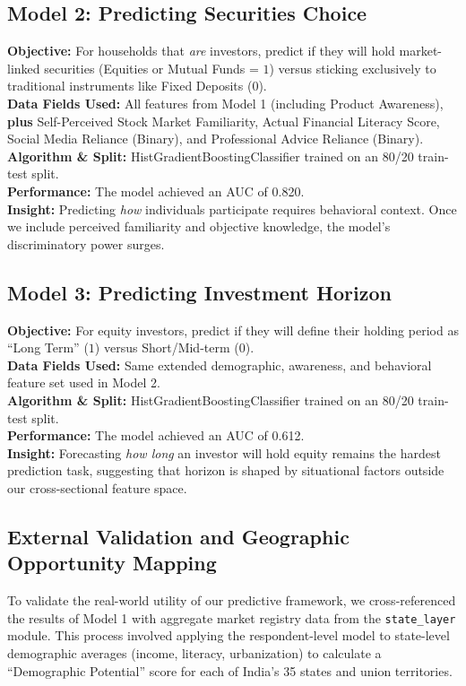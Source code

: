 \documentclass[conference]{IEEEtran}
\begin{document}
\subsection{Model 2: Predicting Securities Choice}
\textbf{Objective:} For households that \textit{are} investors, predict if they will hold market-linked securities (Equities or Mutual Funds = $1$) versus sticking exclusively to traditional instruments like Fixed Deposits ($0$). \\
\textbf{Data Fields Used:} All features from Model 1 (including Product Awareness), \textbf{plus} Self-Perceived Stock Market Familiarity, Actual Financial Literacy Score, Social Media Reliance (Binary), and Professional Advice Reliance (Binary). \\
\textbf{Algorithm \& Split:} HistGradientBoostingClassifier trained on an 80/20 train-test split. \\
\textbf{Performance:} The model achieved an AUC of 0.820. \\
\textbf{Insight:} Predicting \textit{how} individuals participate requires behavioral context. Once we include perceived familiarity and objective knowledge, the model's discriminatory power surges.

\subsection{Model 3: Predicting Investment Horizon}
\textbf{Objective:} For equity investors, predict if they will define their holding period as ``Long Term'' ($1$) versus Short/Mid-term ($0$). \\
\textbf{Data Fields Used:} Same extended demographic, awareness, and behavioral feature set used in Model 2. \\
\textbf{Algorithm \& Split:} HistGradientBoostingClassifier trained on an 80/20 train-test split. \\
\textbf{Performance:} The model achieved an AUC of 0.612. \\
\textbf{Insight:} Forecasting \textit{how long} an investor will hold equity remains the hardest prediction task, suggesting that horizon is shaped by situational factors outside our cross-sectional feature space.

\subsection{External Validation and Geographic Opportunity Mapping}
To validate the real-world utility of our predictive framework, we cross-referenced the results of Model 1 with aggregate market registry data from the \texttt{state\_layer} module. This process involved applying the respondent-level model to state-level demographic averages (income, literacy, urbanization) to calculate a ``Demographic Potential'' score for each of India's 35 states and union territories.
\end{document}
